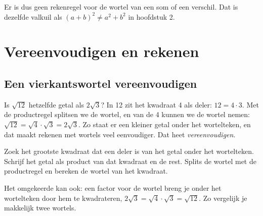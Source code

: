 Er is dus geen rekenregel voor de wortel van een som of een verschil. Dat is dezelfde valkuil als \mbox{$(a + b)^2 \neq a^2 + b^2$} in hoofdstuk 2.

\begin{oefeningen}
\end{oefeningen}

\section{Vereenvoudigen en rekenen}

\subsection{Een vierkantswortel vereenvoudigen}

Is $\sqrt{12}$ hetzelfde getal als $2\sqrt3$? In 12 zit het kwadraat 4 als deler: $12 = 4 \cdot 3$. Met de productregel splitsen we de wortel, en van de 4 kunnen we de wortel nemen: $\sqrt{12} = \sqrt4 \cdot \sqrt3 = 2\sqrt3$. Zo staat er een kleiner getal onder het wortelteken, en dat maakt rekenen met wortels veel eenvoudiger. Dat heet \textit{vereenvoudigen}.


\begin{werkwijze}
Zoek het grootste kwadraat dat een deler is van het getal onder het wortelteken. Schrijf het getal als product van dat kwadraat en de rest. Splits de wortel met de productregel en bereken de wortel van het kwadraat.
\end{werkwijze}

Het omgekeerde kan ook: een factor voor de wortel breng je onder het wortelteken door hem te kwadrateren, $2\sqrt3 = \sqrt4 \cdot \sqrt3 = \sqrt{12}$. Zo vergelijk je makkelijk twee wortels.


